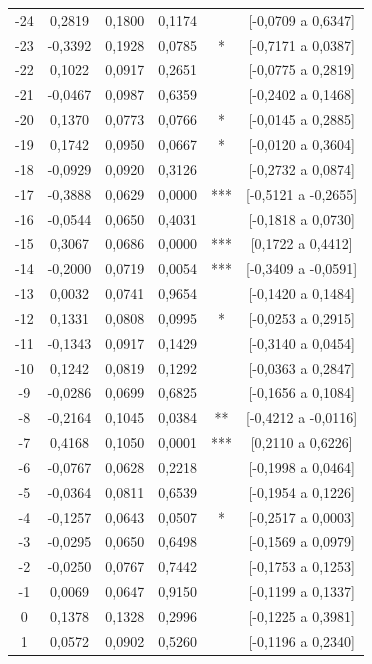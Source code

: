 \documentclass[12pt, a4paper]{article}
\begin{document}
\begin{longtable}{cccccc}
-24 & 0,2819  & 0,1800 & 0,1174 &     & [-0,0709 a 0,6347] \\
-23 & -0,3392 & 0,1928 & 0,0785 & * & [-0,7171 a 0,0387] \\
-22 & 0,1022  & 0,0917 & 0,2651 &     & [-0,0775 a 0,2819] \\
-21 & -0,0467 & 0,0987 & 0,6359 &     & [-0,2402 a 0,1468] \\
-20 & 0,1370  & 0,0773 & 0,0766 & * & [-0,0145 a 0,2885] \\
-19 & 0,1742  & 0,0950 & 0,0667 & * & [-0,0120 a 0,3604] \\
-18 & -0,0929 & 0,0920 & 0,3126 &     & [-0,2732 a 0,0874] \\
-17 & -0,3888 & 0,0629 & 0,0000 & *** & [-0,5121 a -0,2655] \\
-16 & -0,0544 & 0,0650 & 0,4031 &     & [-0,1818 a 0,0730] \\
-15 & 0,3067  & 0,0686 & 0,0000 & *** & [0,1722 a 0,4412] \\
-14 & -0,2000 & 0,0719 & 0,0054 & *** & [-0,3409 a -0,0591] \\
-13 & 0,0032  & 0,0741 & 0,9654 &     & [-0,1420 a 0,1484] \\
-12 & 0,1331  & 0,0808 & 0,0995 & * & [-0,0253 a 0,2915] \\
-11 & -0,1343 & 0,0917 & 0,1429 &     & [-0,3140 a 0,0454] \\
-10 & 0,1242  & 0,0819 & 0,1292 &     & [-0,0363 a 0,2847] \\
-9  & -0,0286 & 0,0699 & 0,6825 &     & [-0,1656 a 0,1084] \\
-8  & -0,2164 & 0,1045 & 0,0384 & ** & [-0,4212 a -0,0116] \\
-7  & 0,4168  & 0,1050 & 0,0001 & *** & [0,2110 a 0,6226] \\
-6  & -0,0767 & 0,0628 & 0,2218 &     & [-0,1998 a 0,0464] \\
-5  & -0,0364 & 0,0811 & 0,6539 &     & [-0,1954 a 0,1226] \\
-4  & -0,1257 & 0,0643 & 0,0507 & * & [-0,2517 a 0,0003] \\
-3  & -0,0295 & 0,0650 & 0,6498 &     & [-0,1569 a 0,0979] \\
-2  & -0,0250 & 0,0767 & 0,7442 &     & [-0,1753 a 0,1253] \\
-1  & 0,0069  & 0,0647 & 0,9150 &     & [-0,1199 a 0,1337] \\
0   & 0,1378  & 0,1328 & 0,2996 &     & [-0,1225 a 0,3981] \\
1   & 0,0572  & 0,0902 & 0,5260 &     & [-0,1196 a 0,2340] \\

\end{longtable}
\end{document}

